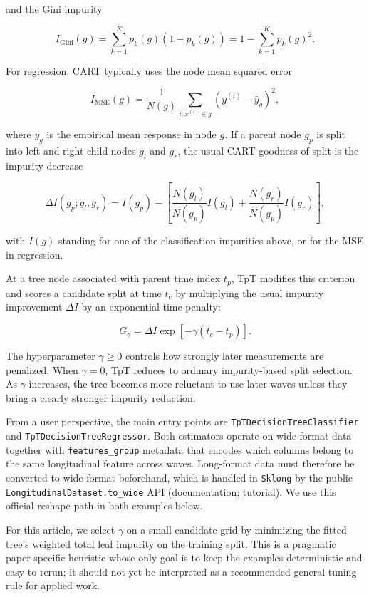 \documentclass[
]{article}
\begin{document}
and the Gini impurity

\[
I_{\text{Gini}}(g) = \sum_{k=1}^{K} p_k(g)\left(1 - p_k(g)\right)
= 1 - \sum_{k=1}^{K} p_k(g)^2.
\]

For regression, CART typically uses the node mean squared error

\[
I_{\text{MSE}}(g) = \frac{1}{N(g)}
\sum_{i: x^{(i)} \in g} \left(y^{(i)} - \bar y_g\right)^2,
\]

where \(\bar y_g\) is the empirical mean response in node \(g\). If a
parent node \(g_p\) is split into left and right child nodes \(g_l\) and
\(g_r\), the usual CART goodness-of-split is the impurity decrease

\[
\Delta I(g_p; g_l, g_r) =
I(g_p) -
\left[
\frac{N(g_l)}{N(g_p)} I(g_l) +
\frac{N(g_r)}{N(g_p)} I(g_r)
\right],
\]

with \(I(g)\) standing for one of the classification impurities above,
or for the MSE in regression.

At a tree node associated with parent time index \(t_p\), TpT modifies
this criterion and scores a candidate split at time \(t_c\) by
multiplying the usual impurity improvement \(\Delta I\) by an
exponential time penalty:

\[
G_{\gamma} = \Delta I \exp \left[-\gamma (t_c - t_p)\right].
\]

The hyperparameter \(\gamma \ge 0\) controls how strongly later
measurements are penalized. When \(\gamma = 0\), TpT reduces to ordinary
impurity-based split selection. As \(\gamma\) increases, the tree
becomes more reluctant to use later waves unless they bring a clearly
stronger impurity reduction.

From a user perspective, the main entry points are
\texttt{TpTDecisionTreeClassifier} and
\texttt{TpTDecisionTreeRegressor}. Both estimators operate on
wide-format data together with \texttt{features\_group} metadata that
encodes which columns belong to the same longitudinal feature across
waves. Long-format data must therefore be converted to wide-format
beforehand, which is handled in \texttt{Sklong} by the public
\texttt{LongitudinalDataset.to\_wide} API
(\href{https://scikit-longitudinal.readthedocs.io/latest/API/data_preparation/longitudinal_dataset/}{documentation};
\href{https://scikit-longitudinal.readthedocs.io/latest/tutorials/long_wide_reshape/}{tutorial}).
We use this official reshape path in both examples below.

For this article, we select \(\gamma\) on a small candidate grid by
minimizing the fitted tree's weighted total leaf impurity on the
training split. This is a pragmatic paper-specific heuristic whose only
goal is to keep the examples deterministic and easy to rerun; it should
not yet be interpreted as a recommended general tuning rule for applied
work.
\end{document}
